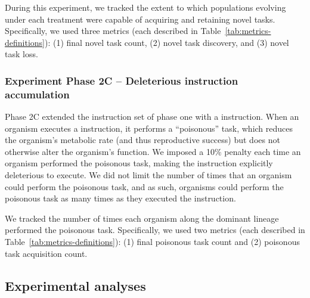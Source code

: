 During this experiment, we tracked the extent to which populations evolving under each treatment were capable of acquiring and retaining novel tasks.  
Specifically, we used three metrics (each described in Table~\ref{tab:metrics-definitions}):
(1) final novel task count, 
(2) novel task discovery, 
and (3) novel task loss. 

\subsubsection{Experiment Phase 2C -- Deleterious instruction accumulation}
\label{sec:methods:exp:deleterious-instruction-accumulation}

Phase 2C extended the instruction set of phase one with a  instruction.
When an organism executes a  instruction, it performs a ``poisonous'' task, which reduces the organism's metabolic rate (and thus reproductive success) but does not otherwise alter the organism's function.
We imposed a 10\% penalty each time an organism performed the poisonous task, making the  instruction explicitly deleterious to execute.
We did not limit the number of times that an organism could perform the poisonous task, and as such, organisms could perform the poisonous task as many times as they executed the  instruction. 

We tracked the number of times each organism along the dominant lineage performed the poisonous task.
Specifically, we used two metrics (each described in Table~\ref{tab:metrics-definitions}):
(1) final poisonous task count and (2) poisonous task acquisition count.

\subsection{Experimental analyses}








